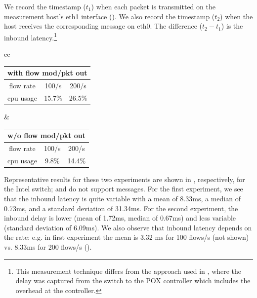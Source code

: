 We record the timestamp ($t_1$) when each packet is transmitted on the
measurement host's eth1 interface (). We also record
the timestamp ($t_2$) when the host receives the corresponding \packetin
message on eth0. The difference ($t_2 - t_1$) is the inbound
latency.\footnote{This measurement technique differs from the approach used
in \cite{ucsdpaper}, where the delay was captured from the switch to the POX
controller which includes the overhead at the controller.}



\begin{table}
\centering
\begin{scriptsize}
\begin{tabular}{cc}
\begin{tabular}{|c|c|c|}
\hline
\multicolumn{3}{|c|}{with flow mod/pkt out} \\ \hline
flow rate & 100/s  & 200/s  \\ \hline
cpu usage & 15.7\%    & 26.5\%   \\ \hline
\end{tabular}
&
\begin{tabular}{|c|c|c|}
\hline
\multicolumn{3}{|c|}{w/o flow mod/pkt out} \\ \hline
flow rate & 100/s   & 200/s \\ \hline
cpu usage & 9.8\%     & 14.4\%   \\ \hline
\end{tabular}
\end{tabular}
\label{fig:inbound-cpu}
\end{scriptsize}
\end{table} 

Representative results for these two experiments are shown in
, respectively,
for the Intel switch; \BroadcomOne and \BroadcomThree do not support \packetin
messages. For the first experiment, we see that the inbound latency is quite
variable with a mean of 8.33ms, a median of 0.73ms, and a standard deviation
of 31.34ms. For the second experiment, the inbound delay is lower (mean of 
1.72ms, median of 0.67ms) and less variable (standard deviation of 6.09ms). 
We also observe that inbound latency depends on the \packetin rate: e.g. in
first experiment the mean is 3.32 ms for 100 flows/s (not shown) vs. 8.33ms
for 200 flows/s ().

